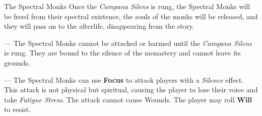 \documentclass[nodeprecatedcode,bg=print]{dndbook/dndbook}
\begin{document}
\begin{WyrdFullNPC}[%
	name=The Spectral Monks,%
	description=Lingering echoes bound in silence,%
	float=!t%
]{The Spectral Monks}
    Once the \emph{Campana Silens} is rung, the Spectral Monks will be freed from their spectral existence, the souls of the monks will be released, and they will pass on to the afterlife, disappearing from the story.

    \vspace{0.5\baselineskip}
    \SkillsBox[%
    skilled={Focus},%
    novice={Awareness}%
    ]

    \begin{TraitsBox}
        \item[Spectral Silence] — The Spectral Monks cannot be attacked or harmed until the \emph{Campana Silens} is rung. They are bound to the silence of the monastery and cannot leave its grounds.
        \item[Silent Screams] — The Spectral Monks can use \textbf{Focus} to attack players with a \emph{Silence} effect. This attack is not physical but spiritual, causing the player to lose their voice and take \emph{Fatigue Stress}. The attack cannot cause Wounds. The player may roll \textbf{Will} to resist.
    \end{TraitsBox}

    \DamageBox[%
        totalfatigue=3,%
        totalmild=0,%
        totalmoderate=0,%
        totalsevere=0,%
    ]

\end{WyrdFullNPC}
\end{document}
